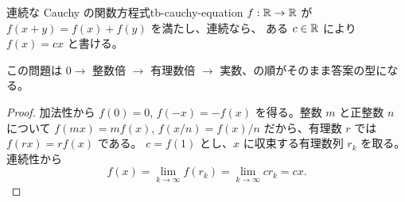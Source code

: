 \begin{theorem}{連続な Cauchy の関数方程式}{tb-cauchy-equation}
$f:\mathbb{R}\to\mathbb{R}$ が $f(x+y)=f(x)+f(y)$ を満たし、連続なら、
ある $c\in\mathbb{R}$ により $f(x)=cx$ と書ける。
\end{theorem}

この問題は $0\to$ 整数倍 $\to$ 有理数倍 $\to$ 実数、の順がそのまま答案の型になる。

\begin{proof}
加法性から $f(0)=0$, $f(-x)=-f(x)$ を得る。整数 $m$ と正整数 $n$ について
$f(mx)=mf(x)$, $f(x/n)=f(x)/n$ だから、有理数 $r$ では $f(rx)=rf(x)$ である。
$c=f(1)$ とし、$x$ に収束する有理数列 $r_k$ を取る。連続性から
\[
f(x)=\lim_{k\to\infty}f(r_k)=\lim_{k\to\infty}cr_k=cx.
\]
\end{proof}
